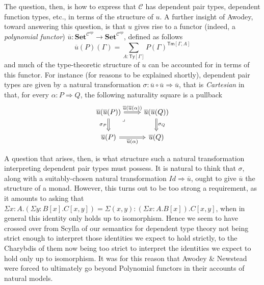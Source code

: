 \documentclass[
  11pt,
  oneside,
  article]{memoir}
\theoremstyle{definition}
\theoremstyle{plain}
\newcommand{\0}{\textsf{0}}
\newcommand{\1}{\tn{\textsf{1}}}
\begin{document}
The question, then, is how to express that \(\mathcal{C}\) has dependent
pair types, dependent function types, etc., in terms of the structure of
\(u\). A further insight of Awodey, toward answering this question, is
that \(u\) gives rise to a functor (indeed, a \emph{polynomial functor})
\(\overline{u} : \mathbf{Set}^{\mathcal{C}^{op}} \to \mathbf{Set}^{\mathcal{C}^{op}}\),
defined as follows \[
\overline{u}(P)(\Gamma) = \sum_{A : \mathsf{Ty}[\Gamma]} P(\Gamma)^{\mathsf{Tm}[\Gamma, A]}
\] and much of the type-theoretic structure of \(u\) can be accounted
for in terms of this functor. For instance (for reasons to be explained
shortly), dependent pair types are given by a natural transformation
\(\sigma : \overline{u} \circ \overline{u} \Rightarrow \overline{u}\),
that is \emph{Cartesian} in that, for every
\(\alpha : P \Rightarrow Q\), the following naturality square is a
pullback \[
\begin{tikzcd}
    {\overline{u}(\overline{u}(P))} & {\overline{u}(\overline{u}(Q))} \\
    {\overline{u}(P)} & {\overline{u}(Q)}
    \arrow["{\overline{u}(\overline{u}(\alpha))}", Rightarrow, from=1-1, to=1-2]
    \arrow["{\sigma_P}"', Rightarrow, from=1-1, to=2-1]
    \arrow["\lrcorner"{anchor=center, pos=0.125}, draw=none, from=1-1, to=2-2]
    \arrow["{\sigma_Q}", Rightarrow, from=1-2, to=2-2]
    \arrow["{\overline{u}(\alpha)}"', Rightarrow, from=2-1, to=2-2]
\end{tikzcd}
\]

A question that arises, then, is what structure such a natural
transformation interpreting dependent pair types must possess. It is
natural to think that \(\sigma\), along with a suitably-chosen natural
transformation \(Id \Rightarrow \overline{u}\), ought to give
\(\overline{u}\) the structure of a monad. However, this turns out to be
too strong a requirement, as it amounts to asking that
\(\Sigma x : A . (\Sigma y : B[x] . C[x,y]) = \Sigma (x,y) : (\Sigma x : A . B[x]) . C[x,y]\),
when in general this identity only holds up to isomorphism. Hence we
seem to have crossed over from Scylla of our semantics for dependent
type theory not being strict enough to interpret those identities we
expect to hold strictly, to the Charybdis of them now being too strict
to interpret the identities we expect to hold only up to isomorphism. It
was for this reason that Awodey \& Newstead were forced to ultimately go
beyond Polynomial functors in their accounts of natural models.
\end{document}

